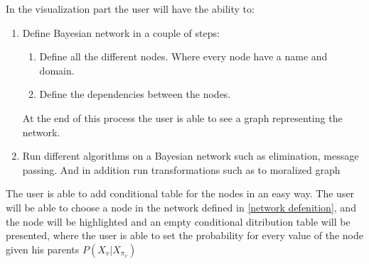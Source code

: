\documentclass{article}
\begin{document}
    \label{network defeniton}
    In the visualization part the user will have the ability to:
    \begin{enumerate}
        \item Define Bayesian network in a couple of steps:
        \begin{enumerate}
            \item Define all the different nodes. Where every node have a name and domain.
            \item Define the dependencies between the nodes.
        \end{enumerate}
        At the end of this process the user is able to see a graph representing the network.
        \item Run different algorithms on a Bayesian network such as elimination, message passing. And in addition run transformations such as to moralized graph 
    \end{enumerate}

    \label{define conditional table}
    The user is able to add conditional table for the nodes in an easy way. The user will be able to choose a node in the network defined in \ref{network defenition},
    and the node will be highlighted and an empty conditional ditribution table will be presented, where the user is able to set the probability for every value of
    the node given his parents $P(X_v|X_{\pi_v})$

    \vspace{0.5cm}
\end{document}
